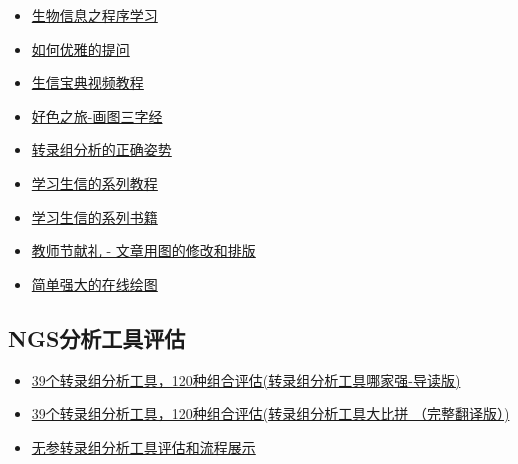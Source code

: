 \documentclass[]{article}
\providecommand{\tightlist}{%
  \setlength{\itemsep}{0pt}\setlength{\parskip}{0pt}}
\numberwithin{figure}{section}
\numberwithin{table}{section}
\theoremstyle{definition}
\theoremstyle{definition}
\theoremstyle{definition}
\theoremstyle{remark}
\begin{document}
\begin{itemize}
\tightlist
\item
  \href{http://mp.weixin.qq.com/s?__biz=MzI5MTcwNjA4NQ==\&mid=2247483927\&idx=1\&sn=23adf2b9d13400f2081f790e674e2cba\&chksm=ec0dc79ddb7a4e8b5bb7a413744319a90f425371b30e2c85224b7c183cc4ad4bbd5d9749bb7b\#rd"\}}{生物信息之程序学习}
\item
  \href{http://mp.weixin.qq.com/s?__biz=MzI5MTcwNjA4NQ==\&mid=2247483955\&idx=1\&sn=946438376f94af6e8861b2b42701914e\&chksm=ec0dc7b9db7a4eafbef28fac1fb260f6f876f0ba674828784ac827dd23f9317f5a2d59d38bc0\#rd}{如何优雅的提问}
\item
  \href{http://mp.weixin.qq.com/s/C4EBufEtFF6bhBKrH8NXng}{生信宝典视频教程}
\item
  \href{https://mp.weixin.qq.com/s/bsvB1k17Izom2ldgdwXrdg}{好色之旅-画图三字经}
\item
  \href{http://mp.weixin.qq.com/s/Kx0gaU2x4pWjBq2I2Ffe6Q}{转录组分析的正确姿势}
\item
  \href{https://mp.weixin.qq.com/s/VguRtaGpEcaNzmZEi48gLg}{学习生信的系列教程}
\item
  \href{http://mp.weixin.qq.com/s/IiehgNu3JGVTDa079ll1SQ}{学习生信的系列书籍}
\item
  \href{https://mp.weixin.qq.com/s/IJNyhinakY0lSXgCN7b9ug}{教师节献礼 -
  文章用图的修改和排版}
\item
  \href{http://mp.weixin.qq.com/s?__biz=MzI5MTcwNjA4NQ==\&mid=2247484624\&idx=1\&sn=7f97f3cd03d6891f71ac3bb778ad84bb\&chksm=ec0dc15adb7a484c0c1a3cfe25892c22d3ffc21276d7ac8ed5794f020b99003a86b3c6d5bc31\#rd}{简单强大的在线绘图}
\end{itemize}

\subsection{NGS分析工具评估}\label{ngs}

\begin{itemize}
\tightlist
\item
  \href{http://mp.weixin.qq.com/s?__biz=MzI5MTcwNjA4NQ==\&mid=2247484106\&idx=1\&sn=687a0def51f6ea91a335754eb3dc9ca9\&chksm=ec0dc740db7a4e564e5b1e93a36e5d9447581e262eec9c2983d1d4e76788d673c9c07dec8f8e\#rd}{39个转录组分析工具，120种组合评估(转录组分析工具哪家强-导读版)}
\item
  \href{http://mp.weixin.qq.com/s?__biz=MzI5MTcwNjA4NQ==\&mid=2247484106\&idx=2\&sn=a09fa127d625c4072ae0343795346c56\&chksm=ec0dc740db7a4e56821f32f60700027c85db46e81089721d1bbe23ceefa86160d9661c2f2d4c\#rd}{39个转录组分析工具，120种组合评估(转录组分析工具大比拼
  （完整翻译版）)}
\item
  \href{http://mp.weixin.qq.com/s/4HANWJY4oL7jGziroHfEpQ}{无参转录组分析工具评估和流程展示}
\end{itemize}
\end{document}
